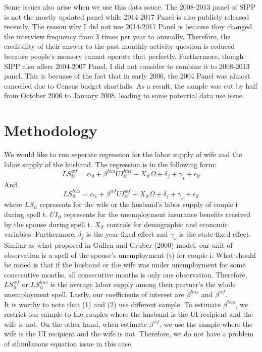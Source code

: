 \documentclass[legalpaper,12pt,margin=1in]{article}
\begin{document}
Some issues also arise when we use this data souce. The 2008-2013 panel of SIPP is not the mostly updated panel while 2014-2017 Panel is also publicly released recently. The reason why I did not use 2014-2017 Panel is because they changed the interview frequency from 3 times per year to annually. Therefore, the credibility of their answer to the past monthly activity question is reduced because people's memory cannot operate that perfectly. Furthermore, though SIPP also offers 2004-2007 Panel, I did not consider to combine it to 2008-2013 panel. This is becuase of the fact that in early 2006, the 2004 Panel was almost cancelled due to Census budget shortfalls. As a result, the sample was cut by half from October 2006 to January 2008, leading to some potential data use issue.

\section{Methodology}
We would like to run seperate regression for the labor supply of wife and the labor supply of the husband. The regression is in the following form:
\begin{equation}
  LS^{wf}_{it} = \alpha_0 + \beta^{hus} UI^{hus}_{it} + X_{it} \Omega + \delta_j + \gamma_s + \epsilon_{it}
\end{equation}
And
\begin{equation}
  LS^{hus}_{it} = \alpha_1 + \beta^{wf} UI^{wf}_{it} + X_{it} \Omega + \delta_j + \gamma_s + \epsilon_{it}
\end{equation}
where $LS_{it}$ represents for the wife or the husband's labor supply of couple i during spell t. $UI_{it}$ represents for the unemployment insurance benefits received by the spouse during spell t. $X_{it}$ controls for demographic and economic variables. Furthermore, $\delta_j$ is the year-fixed effect and $\gamma_s$ is the state-fixed effect. Similar as what proposed in Gullen and Gruber (2000) model, our unit of observation is a spell of the spouse's unemployment (t) for couple i. What should be noted is that if the husband or the wife was under unemployment for some consecutive months, all consecutive months is only one observation. Therefore, $LS^{wf}_{it}$ or $LS^{hus}_{it}$ is the average labor supply among their partner's the whole unemployment spell. Lastly, our coefficients of interest are $\beta^{hus}$ and $\beta^{wf}$. \\
It is worthy to note that (1) and (2) use different sample. To estimate $\beta^{hus}$, we restrict our sample to the couples where the husband is the UI recipient and the wife is not. On the other hand, when estimate $\beta^{wf}$, we use the sample where the wife is the UI recipient and the wife is not. Therefore, we do not have a problem of silmulanous equation issue in this case.\\
\end{document}
